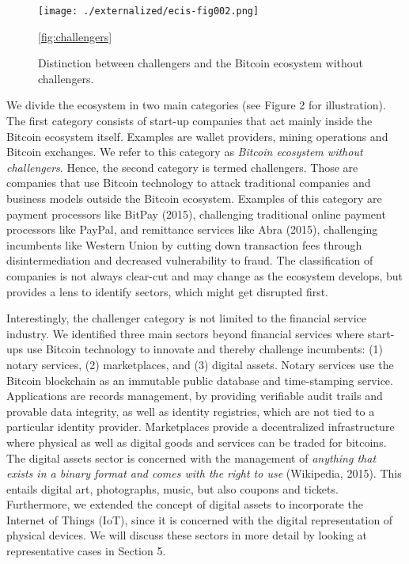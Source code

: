 \begin{figure}[htbp]
\centering
\texttt{[image: ./externalized/ecis-fig002.png]}
\caption{Distinction between challengers and the Bitcoin ecosystem without 
challengers.}
\ref{fig:challengers}
\end{figure}

We divide the ecosystem in two main categories (see Figure 2 for illustration). 
The first category consists of start-up companies that act mainly inside the Bitcoin 
ecosystem itself. Examples are wallet providers, mining operations and Bitcoin 
exchanges. We refer to this category as \emph{Bitcoin ecosystem without challengers}. 
Hence, the second category is termed challengers. Those are companies that use 
Bitcoin technology to attack traditional companies and business models outside 
the Bitcoin ecosystem. Examples of this category are payment processors like BitPay 
(2015), challenging traditional online payment processors like PayPal, and remittance 
services like Abra (2015), challenging incumbents like Western Union by cutting 
down transaction fees through disintermediation and decreased vulnerability to 
fraud. The classification of companies is not always clear-cut and may change as 
the ecosystem develops, but provides a lens to identify sectors, which might get 
disrupted first.

Interestingly, the challenger category is not limited to the financial service 
industry. We identified three main sectors beyond financial services where start-ups 
use Bitcoin technology to innovate and thereby challenge incumbents: (1) notary 
services, (2) marketplaces, and (3) digital assets. Notary services use the Bitcoin 
blockchain as an immutable public database and time-stamping service. Applications 
are records management, by providing verifiable audit trails and provable data 
integrity, as well as identity registries, which are not tied to a particular identity 
provider. Marketplaces provide a decentralized infrastructure where physical as 
well as digital goods and services can be traded for bitcoins. The digital assets 
sector is concerned with the management of \emph{anything that exists in a binary format 
and comes with the right to use} (Wikipedia, 2015). This entails digital art, 
photographs, music, but also coupons and tickets. Furthermore, we extended the 
concept of digital assets to incorporate the Internet of Things (IoT), since it 
is concerned with the digital representation of physical devices. We will discuss 
these sectors in more detail by looking at representative cases in Section 5.

